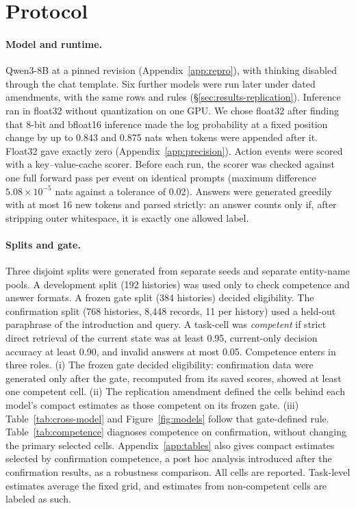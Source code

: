 \section{Protocol}
\label{sec:protocol}

\paragraph{Model and runtime.} Qwen3-8B \citep{yang2025qwen3} at a pinned revision
(Appendix~\ref{app:repro}), with thinking disabled through the chat template. Six further models were
run later under dated amendments, with the same rows and rules (\S\ref{sec:results-replication}). Inference ran in float32
without quantization on one GPU. We chose float32 after finding that 8-bit and bfloat16 inference made
the log probability at a fixed position change by up to 0.843 and 0.875 nats when tokens were appended
after it. Float32 gave exactly zero (Appendix~\ref{app:precision}). Action events were scored with a
key--value-cache scorer. Before each run, the scorer was checked against one full forward pass per event
on identical prompts (maximum difference $5.08\times10^{-5}$ nats against a tolerance of 0.02). Answers
were generated greedily with at most 16 new tokens and parsed strictly: an answer counts only if, after
stripping outer whitespace, it is exactly one allowed label.

\paragraph{Splits and gate.} Three disjoint splits were generated from separate seeds and separate
entity-name pools. A development split (192 histories) was used only to check competence and answer
formats. A frozen gate split (384 histories) decided eligibility. The confirmation split (768 histories,
8{,}448 records, 11 per history) used a held-out paraphrase of the introduction and query. A task-cell
was \emph{competent} if strict direct retrieval of the current state was at least 0.95, current-only
decision accuracy at least 0.90, and invalid answers at most 0.05. Competence enters in three roles. (i) The frozen gate decided eligibility: confirmation data were
generated only after the gate, recomputed from its saved scores, showed at least one competent cell. (ii)
The replication amendment defined the cells behind each model's compact estimates as those competent on
its frozen gate. (iii) Table~\ref{tab:cross-model} and Figure~\ref{fig:models} follow that gate-defined rule.
Table~\ref{tab:competence} diagnoses competence on confirmation, without changing the primary selected
cells. Appendix~\ref{app:tables} also gives compact estimates selected by confirmation competence, a
post hoc analysis introduced after the confirmation results, as a robustness comparison. All cells are reported. Task-level estimates average the fixed grid, and estimates from non-competent cells are labeled
as such.

